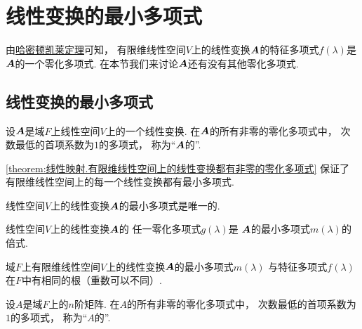 \section{线性变换的最小多项式}
由\hyperref[theorem:线性映射.哈密顿--凯莱定理2]{哈密顿凯莱定理}可知，
有限维线性空间\(V\)上的线性变换\(\boldsymbol{A}\)的特征多项式\(f(\lambda)\)是\(\boldsymbol{A}\)的一个零化多项式.
在本节我们来讨论\(\boldsymbol{A}\)还有没有其他零化多项式.

\subsection{线性变换的最小多项式}
\begin{definition}
设\(\boldsymbol{A}\)是域\(F\)上线性空间\(V\)上的一个线性变换.
在\(\boldsymbol{A}\)的所有非零的零化多项式中，
次数最低的首项系数为\(1\)的多项式，
称为“\(\boldsymbol{A}\)的”.
\end{definition}
\begin{remark}
\cref{theorem:线性映射.有限维线性空间上的线性变换都有非零的零化多项式}
保证了有限维线性空间上的每一个线性变换都有最小多项式.
\end{remark}

\begin{proposition}
线性空间\(V\)上的线性变换\(\boldsymbol{A}\)的最小多项式是唯一的.
\end{proposition}

\begin{proposition}
线性空间\(V\)上的线性变换\(\boldsymbol{A}\)的
任一零化多项式\(g(\lambda)\)是
\(\boldsymbol{A}\)的最小多项式\(m(\lambda)\)的倍式.
\end{proposition}

\begin{proposition}\label{theorem:最小多项式.线性变换的特征多项式与最小多项式有相同根}
域\(F\)上有限维线性空间\(V\)上的线性变换\(\boldsymbol{A}\)的最小多项式\(m(\lambda)\)
与特征多项式\(f(\lambda)\)
在\(F\)中有相同的根（重数可以不同）.
\end{proposition}

\begin{definition}
设\(A\)是域\(F\)上的\(n\)阶矩阵.
在\(A\)的所有非零的零化多项式中，
次数最低的首项系数为\(1\)的多项式，
称为“\(A\)的”.
\end{definition}


